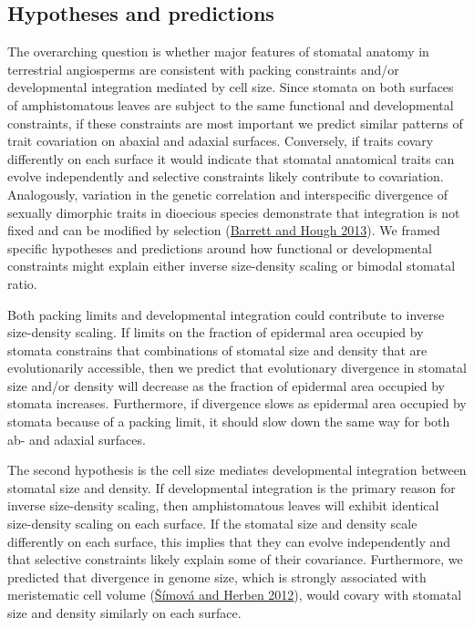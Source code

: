 \documentclass[
  12pt,
]{article}
\begin{document}
\hypertarget{hypotheses-and-predictions}{%
\subsection{Hypotheses and predictions}\label{hypotheses-and-predictions}}

The overarching question is whether major features of stomatal anatomy in terrestrial angiosperms are consistent with packing constraints and/or developmental integration mediated by cell size. Since stomata on both surfaces of amphistomatous leaves are subject to the same functional and developmental constraints, if these constraints are most important we predict similar patterns of trait covariation on abaxial and adaxial surfaces. Conversely, if traits covary differently on each surface it would indicate that stomatal anatomical traits can evolve independently and selective constraints likely contribute to covariation. Analogously, variation in the genetic correlation and interspecific divergence of sexually dimorphic traits in dioecious species demonstrate that integration is not fixed and can be modified by selection (\protect\hyperlink{ref-barrett_sexual_2013}{Barrett and Hough 2013}). We framed specific hypotheses and predictions around how functional or developmental constraints might explain either inverse size-density scaling or bimodal stomatal ratio.


Both packing limits and developmental integration could contribute to inverse size-density scaling. If limits on the fraction of epidermal area occupied by stomata constrains that combinations of stomatal size and density that are evolutionarily accessible, then we predict that evolutionary divergence in stomatal size and/or density will decrease as the fraction of epidermal area occupied by stomata increases. Furthermore, if divergence slows as epidermal area occupied by stomata because of a packing limit, it should slow down the same way for both ab- and adaxial surfaces.

The second hypothesis is the cell size mediates developmental integration between stomatal size and density. If developmental integration is the primary reason for inverse size-density scaling, then amphistomatous leaves will exhibit identical size-density scaling on each surface. If the stomatal size and density scale differently on each surface, this implies that they can evolve independently and that selective constraints likely explain some of their covariance. Furthermore, we predicted that divergence in genome size, which is strongly associated with meristematic cell volume (\protect\hyperlink{ref-simova_geometrical_2012}{Šímová and Herben 2012}), would covary with stomatal size and density similarly on each surface.
\end{document}
